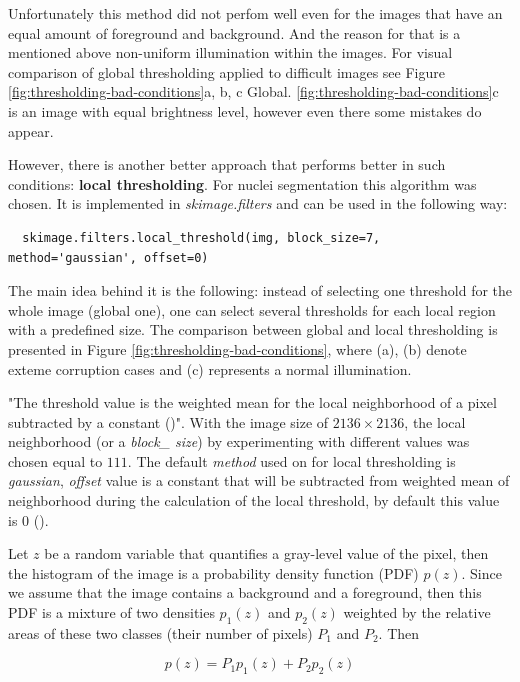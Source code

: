 Unfortunately this method did not perfom well even for the images that have an equal amount of foreground and background. And the reason for that is a mentioned above non-uniform illumination within the images. For visual comparison of global thresholding applied to difficult images see Figure \ref{fig:thresholding-bad-conditions}a, b, c Global. \ref{fig:thresholding-bad-conditions}c is an image with equal brightness level, however even there some mistakes do appear.

However, there is another better approach that performs better in such conditions: \textbf{local thresholding}. For nuclei segmentation this algorithm was chosen. It is implemented in \textit{skimage.filters} and can be used in the following way:

\begin{lstlisting}
  skimage.filters.local_threshold(img, block_size=7, method='gaussian', offset=0)
\end{lstlisting}

The main idea behind it is the following: instead of selecting one threshold for the whole image (global one), one can select several thresholds for each local region with a predefined size. The comparison between global and local thresholding is presented in Figure \ref{fig:thresholding-bad-conditions}, where (a), (b) denote exteme corruption cases and (c) represents a normal illumination.

"The threshold value is the weighted mean for the local neighborhood of a pixel subtracted by a constant (\cite{digital_image_book})". With the image size of $2136 \times 2136$, the local neighborhood (or a \textit{block\_ size}) by experimenting with different values was chosen equal to $111$. The default \textit{method} used on for local thresholding is \textit{gaussian}, \textit{offset} value is a constant that will be subtracted from weighted mean of neighborhood during the calculation of the local threshold, by default this value is $0$ (\cite{local_thresholding}).

Let $z$ be a random variable that quantifies a gray-level value of the pixel, then the histogram of the image is a probability density function (PDF) $p(z)$. Since we assume that the image contains a background and a foreground, then this PDF is a mixture of two densities $p_1(z)$ and $p_2(z)$ weighted by the relative areas of these two classes (their number of pixels) $P_1$ and $P_2$. Then 

\begin{equation}
    p(z) = P_1 p_1(z) + P_2 p_2(z)
\end{equation}

